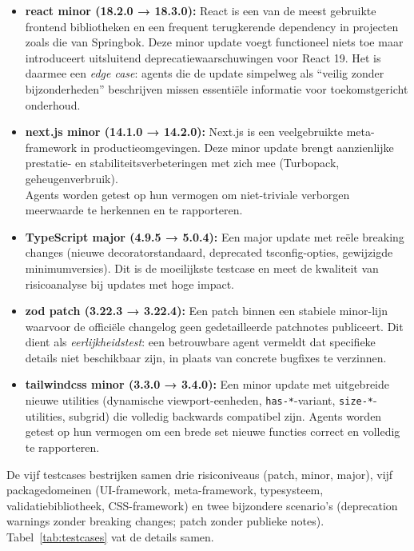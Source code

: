 \begin{itemize}
    \item \textbf{react minor (18.2.0 → 18.3.0):} React is een van de meest gebruikte frontend bibliotheken en een frequent terugkerende dependency in projecten zoals die van Springbok. Deze minor update voegt functioneel niets toe maar introduceert uitsluitend deprecatiewaarschuwingen voor React 19. Het is daarmee een \textit{edge case}: agents die de update simpelweg als ``veilig zonder bijzonderheden'' beschrijven missen essentiële informatie voor toekomstgericht onderhoud.
    \item \textbf{next.js minor (14.1.0 → 14.2.0):} Next.js is een veelgebruikte meta-framework in productieomgevingen. Deze minor update brengt aanzienlijke prestatie- en stabiliteitsverbeteringen met zich mee (Turbopack, geheugenverbruik). \\Agents worden getest op hun vermogen om niet-triviale verborgen meerwaarde te herkennen en te rapporteren.
    \item \textbf{TypeScript major (4.9.5 → 5.0.4):} Een major update met reële breaking changes (nieuwe decoratorstandaard, deprecated tsconfig-opties, gewijzigde minimumversies). Dit is de moeilijkste testcase en meet de kwaliteit van risicoanalyse bij updates met hoge impact.
    \item \textbf{zod patch (3.22.3 → 3.22.4):} Een patch binnen een stabiele minor-lijn waarvoor de officiële changelog geen gedetailleerde patchnotes publiceert. Dit dient als \textit{eerlijkheidstest}: een betrouwbare agent vermeldt dat specifieke details niet beschikbaar zijn, in plaats van concrete bugfixes te verzinnen.
    \item \textbf{tailwindcss minor (3.3.0 → 3.4.0):} Een minor update met uitgebreide nieuwe utilities (dynamische viewport-eenheden, \texttt{has-*}-variant, \texttt{size-*}-utilities, subgrid) die volledig backwards compatibel zijn. Agents worden getest op hun vermogen om een brede set nieuwe functies correct en volledig te rapporteren.
\end{itemize}

De vijf testcases bestrijken samen drie risiconiveaus (patch, minor, major), vijf packagedomeinen (UI-framework, meta-framework, typesysteem, validatiebibliotheek, CSS-framework) en twee bijzondere scenario's (deprecation warnings zonder breaking changes; patch zonder publieke notes). Tabel~\ref{tab:testcases} vat de details samen.


